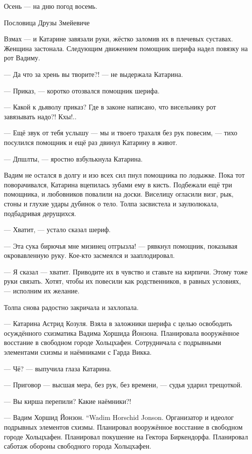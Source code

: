 \asterism

\epigraph
{Осень --- на дню погод восемь.}
{Пословица Друзы Змейевиче}

Взмах --- и Катарине завязали руки, жёстко заломив их в плечевых суставах.
Женщина застонала.
Следующим движением помощник шерифа надел повязку на рот Вадиму.

--- Да что за хрень вы творите?! --- не выдержала Катарина.

--- Приказ, --- коротко отозвался помощник шерифа.

--- Какой к дьяволу приказ?
Где в законе написано, что висельнику рот завязывать надо?!
Кхы!..

--- Ещё звук от тебя услышу --- мы и твоего трахаля без рук повесим, --- тихо посулился помощник и ещё раз двинул Катарину в живот.

--- Дпшлты, --- яростно взбулькнула Катарина.

Вадим не остался в долгу и изо всех сил пнул помощника по лодыжке.
Пока тот поворачивался, Катарина вцепилась зубами ему в кисть.
Подбежали ещё три помощника, и любовников повалили на доски.
Виселицу огласили визг, рык, стоны и глухие удары дубинок о тело.
Толпа засвистела и заулюлюкала, подбадривая дерущихся.

--- Хватит, --- устало сказал шериф.

--- Эта сука бирючья мне мизинец отгрызла! --- рявкнул помощник, показывая окровавленную руку.
Кое-кто засмеялся и зааплодировал.

--- Я сказал --- хватит.
Приводите их в чувство и ставьте на кирпичи.
Этому тоже руки связать.
Хотят, чтобы их повесили как родственников, в равных условиях, --- исполним их желание.

Толпа снова радостно закричала и захлопала.

\asterism

--- Катарина Астрид Козуля.
Взяла в заложники шерифа с целью освободить осуждённого схизматика Вадима Хоршида Йонзона.
Планировала вооружённое восстание в свободном городе Хольцхафен.
Сотрудничала с подрывными элементами схизмы и наёмниками с Гарда Викка.

--- Чё? --- выпучила глаза Катарина.

--- Приговор --- высшая мера, без рук, без времени, --- судья ударил трещоткой.

--- Вы кирша перепили?
Какие наёмники?!

{--- Вадим Хоршид Йонзон.}
{``Wadim Horschid Jonson.}
Организатор и идеолог подрывных элементов схизмы.
Планировал вооружённое восстание в свободном городе Хольцхафен.
Планировал покушение на Гектора Биркендорфа.
Планировал саботаж обороны свободного города Хольцхафен.

